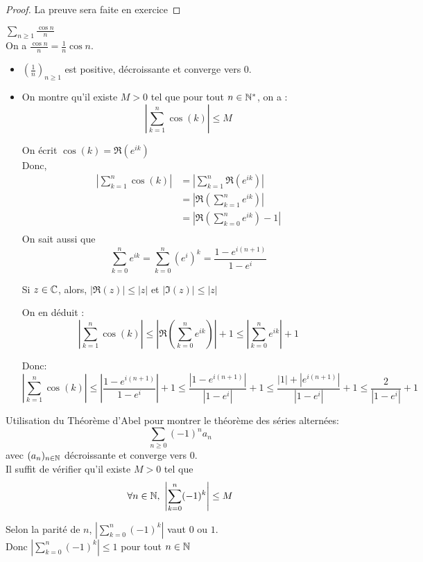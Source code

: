 \documentclass[../main.tex]{subfile}
\begin{document}
\begin{proof}
	La preuve sera faite en exercice
\end{proof}

\begin{ex}
	$\sum\limits_{n \geq 1} \frac{\cos n}{n}$\\
	On a $\frac{\cos n}{n} = \frac{1}{n} \cos n$.\\
\begin{itemize}	
	\item $(\frac{1}{n})_{n \geq 1}$ est positive, décroissante et converge vers $0$.
	\item On montre qu'il existe $M > 0$ tel que pour tout $n \in \mathbb{N}^*$, on a :
	$$\left| \sum\limits_{k =1}^n \cos(k) \right| \leq M$$

	On écrit $\cos(k) = \Re (e^{ik})$\\
	Donc, 
	$$
\begin{aligned}
	\left| \sum\limits_{k=1}^n \cos(k) \right| &= \left| \sum\limits_{k=1}^n \Re(e^{ik}) \right|\\
	&= \left| \Re(\sum\limits_{k=1}^n e^{ik}) \right|\\
	&= \left| \Re(\sum\limits_{k=0}^n e^{ik}) -1 \right|\\
\end{aligned}
	$$
	On sait aussi que 
	$$\sum\limits_{k=0}^n e^{ik} = \sum\limits_{k=0}^n (e^i)^k = \frac{1 - e^{i(n+1)}}{1 - e^i}$$
\begin{rap}	
	Si $z \in \mathbb{C}$, alors, $|\Re(z)| \leq |z|$ et $|\Im(z)| \leq |z|$
\end{rap}
	On en déduit :
	$$\left| \sum\limits_{k=1}^n \cos(k) \right| 
	\leq \left| \Re(\sum\limits_{k=0}^n e^{ik}) \right| + 1
	\leq \left| \sum\limits_{k=0}^n e^{ik} \right| + 1 $$

	Donc:
	$$\left| \sum\limits_{k=1}^n \cos(k) \right| 
	\leq \left| \frac{1 - e^{i(n+1)}}{1 - e^i} \right| + 1
	\leq \frac{|1 - e^{i(n+1)}|}{|1 - e^i|} + 1
	\leq \frac{|1| + |e^{i(n+1)}|}{|1 - e^i|} + 1
	\leq \frac{2}{|1 - e^i|} + 1
	$$
\end{itemize}
\end{ex}

\begin{exerc}	
	Utilisation du Théorème d'Abel pour montrer le théorème des séries alternées:
	$$\sum\limits_{n \geq 0} (-1)^n a_n$$
	avec $(a_n)_{n \in \mathbb{N}}$ décroissante et converge vers $0$.\\

	Il suffit de vérifier qu'il existe $M > 0$ tel que 
	$$\forall n \in \mathbb{N}, \ \left| \sum\limits_{k=0}^n (-1)^k \right| \leq M$$

	Selon la parité de $n$,	$\left| \sum\limits_{k=0}^n (-1)^k \right|$ vaut $0$ ou $1$.\\
	Donc $\left| \sum\limits_{k=0}^n (-1)^k \right| \leq 1$ pour tout $n \in \mathbb{N}$

\end{exerc}
\end{document}
